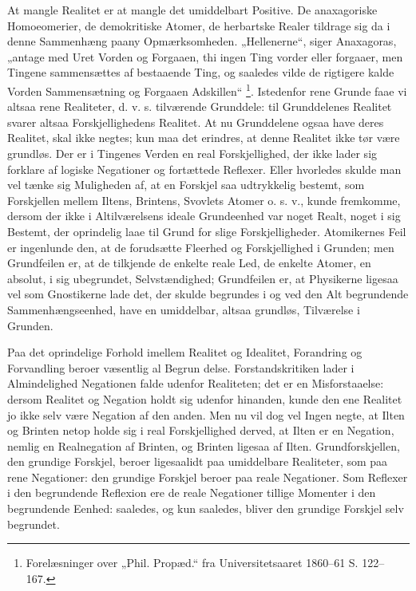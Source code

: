 \documentclass[11pt]{book}
\newcommand{\opage}[1]{\marginnote{\footnotesize\textit{[#1]}}}
\begin{document}
At mangle Realitet er at mangle det umiddelbart Positive. De
anaxagoriske Homoeomerier, de demokritiske Atomer, de herbartske
Realer tildrage sig da i denne Sammenhæng paany Opmærksomheden.
„Hellenerne“, siger Anaxagoras, „antage med Uret Vorden og
Forgaaen, thi ingen Ting vorder eller forgaaer, men Tingene
sammensættes af bestaaende Ting, og saaledes vilde de rigtigere
kalde Vorden Sammensætning og Forgaaen Adskillen“%
\footnote{Forelæsninger over „Phil. Propæd.“ fra Universitetsaaret
1860--61 S. 122--167.}. Istedenfor rene Grunde faae vi altsaa rene
Realiteter, d. v. s. tilværende Grunddele: til Grunddelenes
Realitet svarer altsaa Forskjellighedens Realitet. At nu
Grunddelene ogsaa have deres Realitet, skal ikke negtes; kun maa
det erindres, at denne Realitet ikke tør være grundløs. Der er i
Tingenes Verden en real Forskjellighed, der ikke lader sig forklare
af logiske Negationer og fortættede Reflexer. Eller hvorledes
skulde man vel tænke sig Muligheden af, at en Forskjel saa
udtrykkelig bestemt, som Forskjellen mellem Iltens, Brintens,
Svovlets Atomer o. s. v., kunde fremkomme, dersom der ikke i
Altilværelsens ideale Grundeenhed var noget Realt, noget i sig
Bestemt, der oprindelig laae til Grund for slige Forskjelligheder.
Atomikernes Feil er ingenlunde den, at de forudsætte Fleerhed og
Forskjellighed i Grunden; men Grundfeilen er, at de tilkjende de
enkelte reale Led, de enkelte Atomer, en absolut, i sig ubegrundet,
Selvstændighed; Grundfeilen er, at Physikerne ligesaa vel som
Gnostikerne lade det, der skulde begrundes i og ved den Alt
begrundende Sammenhængseenhed, have en umiddelbar, altsaa grundløs,
Tilværelse i Grunden.

Paa det oprindelige Forhold imellem Realitet og Idealitet,
Forandring og Forvandling beroer væsentlig al Begrun\-%
\opage{98} \setcounter{footnote}{0}%
delse. Forstandskritiken lader i Almindelighed Negationen falde
udenfor Realiteten; det er en Misforstaaelse: dersom Realitet og
Negation holdt sig udenfor hinanden, kunde den ene Realitet jo ikke
selv være Negation af den anden. Men nu vil dog vel Ingen negte,
at Ilten og Brinten netop holde sig i real Forskjellighed derved,
at Ilten er en Negation, nemlig en Realnegation af Brinten, og
Brinten ligesaa af Ilten. Grundforskjellen, den grundige Forskjel,
beroer ligesaalidt paa umiddelbare Realiteter, som paa rene
Negationer: den grundige Forskjel beroer paa reale Negationer. Som
Reflexer i den begrundende Reflexion ere de reale Negationer
tillige Momenter i den begrundende Eenhed: saaledes, og kun
saaledes, bliver den grundige Forskjel selv begrundet.
\end{document}
